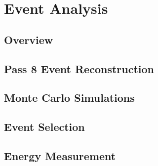 \section{Event Analysis}

\subsection{Overview}

\subsection{Pass 8 Event Reconstruction}

\subsection{Monte Carlo Simulations}

\subsection{Event Selection}

\subsection{Energy Measurement}